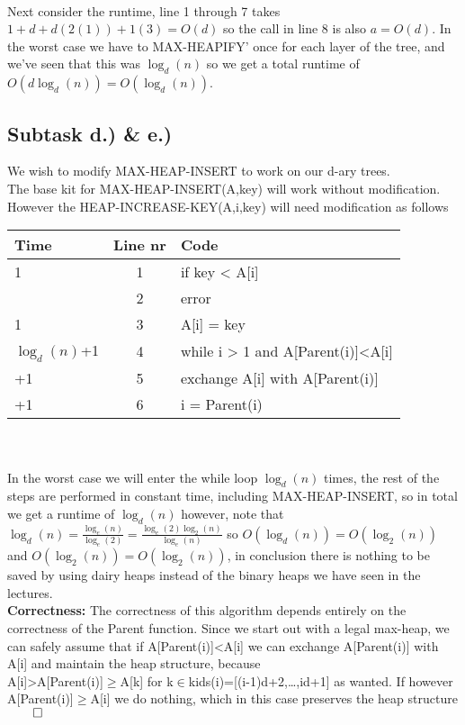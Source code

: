 \documentclass{article}
\theoremstyle{remark}
\numberwithin{equation}{section}
\begin{document}
\\Next consider the runtime, line 1 through 7 takes $1+d+d(2(1))+1(3)= O(d)$ so the call in line 8 is also $a = O(d)$. In the worst case we have to MAX-HEAPIFY' once for each layer of the tree, and we've seen that this was $\log_d(n)$ so we get a total runtime of $O(d\log_d(n)) = O(\log_d(n))$.
\newpage\subsection{Subtask d.) \& e.)} We wish to modify MAX-HEAP-INSERT to work on our d-ary trees.
\\The base kit for MAX-HEAP-INSERT(A,key) will work without modification. However the HEAP-INCREASE-KEY(A,i,key) will need modification as follows
\\\begin{tabular}{l | c | l}
	Time & Line nr & Code \\ \hline
	1 & 1 & if key < A[i] \\
	\indent 1 & 2 & \indent error \\
	1 & 3 & A[i] = key \\
	$\log_d(n)$+1 & 4 & while i > 1 and A[Parent(i)]<A[i] \\
	\indent 3+1 & 5 & \indent exchange A[i] with A[Parent(i)] \\
	\indent 1+1 & 6 & \indent i = Parent(i) 
\end{tabular}\\\\
In the worst case we will enter the while loop $\log_d(n)$ times, the rest of the steps are performed in constant time, including MAX-HEAP-INSERT, so in total we get a runtime of $\log_d(n)$ however, note that $\log_d(n) = \frac{\log_e(n)}{\log_e(2)} = \frac{\log_e(2)\log_2(n)}{\log_e(n)}$ so $O(\log_d(n)) = O(\log_2(n))$ and $O(\log_2(n)) = O(\log_2(n))$, in conclusion there is nothing to be saved by using dairy heaps instead of the binary heaps we have seen in the lectures. 
\\\textbf{Correctness: }The correctness of this algorithm depends entirely on the correctness of the Parent function. Since we start out with a legal max-heap, we can safely assume that if A[Parent(i)]<A[i] we can exchange A[Parent(i)] with A[i] and maintain the heap structure, because\\ A[i]>A[Parent(i)]$\geq$A[k] for k$\in$kids(i)=[(i-1)d+2,\dots,id+1] as wanted. If however A[Parent(i)]$\geq$A[i] we do nothing, which in this case preserves the heap structure $\qed$
\end{document}
